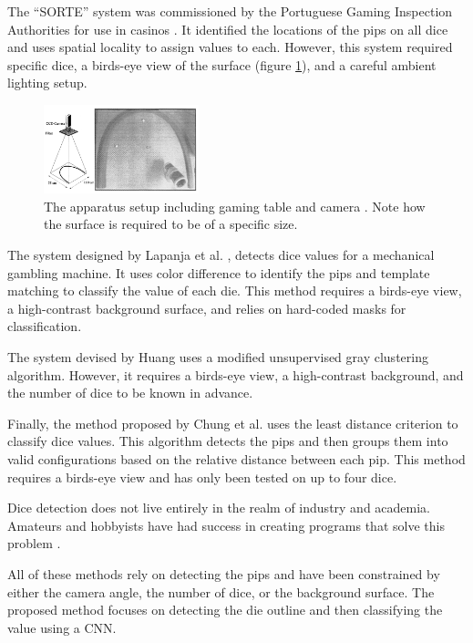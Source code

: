 \documentclass[conference]{IEEEtran}
\begin{document}
The ``SORTE'' system was commissioned by the Portuguese Gaming Inspection Authorities for use in casinos \cite{Correia1995}.
It identified the locations of the pips on all dice and uses spatial locality to assign values to each.
However, this system required specific dice, a birds-eye view of the surface (figure \ref{fig:prior_1a}), and a careful ambient lighting setup.
\begin{figure}
	\centering
	\includegraphics[width=0.4\textwidth]{prior_1a}
	\caption{The apparatus setup including gaming table and camera \cite{Lapanjaa}. Note how the surface is required to be of a specific size.}
	\label{fig:prior_1a}
\end{figure}

The system designed by Lapanja et al. \cite{Lapanjaa}, detects dice values for a mechanical gambling machine.
It uses color difference to identify the pips and template matching to classify the value of each die.
This method requires a birds-eye view, a high-contrast background surface, and relies on hard-coded masks for classification.

The system devised by Huang \cite{Huang2008} uses a modified unsupervised gray clustering algorithm. 
However, it requires a birds-eye view, a high-contrast background, and the number of dice to be known in advance.

Finally, the method proposed by Chung et al. \cite{Chung2009} uses the least distance criterion to classify dice values.
This algorithm detects the pips and then groups them into valid configurations based on the relative distance between each pip.
This method requires a birds-eye view and has only been tested on up to four dice.

Dice detection does not live entirely in the realm of industry and academia.
Amateurs and hobbyists have had success in creating programs that solve this problem \cite{Gideon2018}\cite{Pesce2019}.  

All of these methods rely on detecting the pips and have been constrained by either the camera angle, the number of dice, or the background surface.
The proposed method focuses on detecting the die outline and then classifying the value using a CNN.
\end{document}
